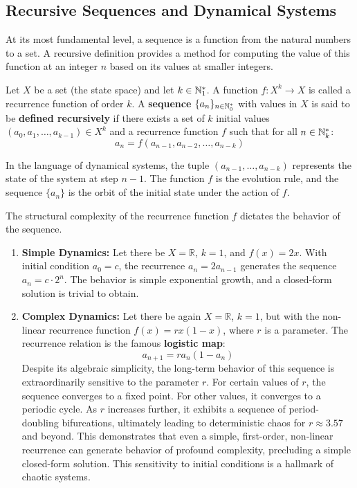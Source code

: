 \subsection{Recursive Sequences and Dynamical Systems}

At its most fundamental level, a sequence is a function from the natural numbers to a set. A recursive definition provides a method for computing the value of this function at an integer $n$ based on its values at smaller integers.

\begin{definition}
Let $X$ be a set (the state space) and let $k \in \mathbb{N}_{1}^*$. A function $f: X^k \to X$ is called a recurrence function of order $k$. A \textbf{sequence} $\{a_n\}_{n \in \mathbb{N}_{0}^*}$ with values in $X$ is said to be \textbf{defined recursively} if there exists a set of $k$ initial values $(a_0, a_1, \dots, a_{k-1}) \in X^k$ and a recurrence function $f$ such that for all $n \in \mathbb{N}_{k}^*$:
$$ a_n = f(a_{n-1}, a_{n-2}, \dots, a_{n-k}) $$
\end{definition}

In the language of dynamical systems, the tuple $(a_{n-1}, \dots, a_{n-k})$ represents the state of the system at step $n-1$. The function $f$ is the evolution rule, and the sequence $\{a_n\}$ is the orbit of the initial state under the action of $f$.

\begin{remark}
The structural complexity of the recurrence function $f$ dictates the behavior of the sequence.
\begin{enumerate}
    \item \textbf{Simple Dynamics:} Let there be $X = \mathbb{R}$, $k=1$, and $f(x) = 2x$. With initial condition $a_0 = c$, the recurrence $a_n = 2a_{n-1}$ generates the sequence $a_n = c \cdot 2^n$. The behavior is simple exponential growth, and a closed-form solution is trivial to obtain.
    \item \textbf{Complex Dynamics:} Let there be again $X=\mathbb{R}$, $k=1$, but with the non-linear recurrence function $f(x) = rx(1-x)$, where $r$ is a parameter. The recurrence relation is the famous \textbf{logistic map}:
    $$ a_{n+1} = r a_n (1-a_n) $$
    Despite its algebraic simplicity, the long-term behavior of this sequence is extraordinarily sensitive to the parameter $r$. For certain values of $r$, the sequence converges to a fixed point. For other values, it converges to a periodic cycle. As $r$ increases further, it exhibits a sequence of period-doubling bifurcations, ultimately leading to deterministic chaos for $r \approx 3.57$ and beyond. This demonstrates that even a simple, first-order, non-linear recurrence can generate behavior of profound complexity, precluding a simple closed-form solution. This sensitivity to initial conditions is a hallmark of chaotic systems.
\end{enumerate}
\end{remark}

